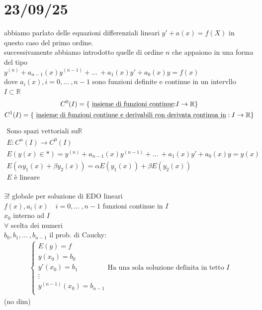 \documentclass[a4paper, oneside]{article}
\begin{document}
\begin{definition}
\end{definition}

\section{23/09/25}
abbiamo parlato delle equazioni differenziali lineari $y' +a(x) = f(X)$ in questo caso del primo ordine.\\
successivamente abbiamo introdotto quelle di ordine $n$ che appaiono in una forma del tipo\\
$y^{(n)}+ a_{n-1}(x)y^{(n-1)}+ ... \ + a_1(x)y' + a_0(x)y = f(x)$\\
dove $a_i(x), i = 0, ... \ , n-1$ sono funzioni definite e continue in un intervllo $I \subset \mathbb{R}$\\

\begin{gather*} 
    C^0(I) = \{\text{ \underbar{insieme di funzioni continue}:} I \to \mathbb{R}\}\\
    C^1(I) = \{\text{ \underbar{insieme di funzioni continue e derivabili con derivata continua in}}: I \to \mathbb{R}\}\\
\end{gather*}


\begin{gather*}
\text{Sono spazi vettoriali su} \mathbb{R}\\
E: C^n(I) \to C^0(I)\\
E (y(x) \in \text{*} ) = y^{(n)}+ a_{n-1}(x)y^{(n-1)}+ ... \ + a_1(x)y' + a_0(x)y = y(x)\\
E(\alpha y_1(x) + \beta y_2(x)) = \alpha E (y_1(x)) + \beta E (y_2(x))\\
E \text{ è lineare}\\
\end{gather*}

\begin{theorem}
        $\exists !$ globale per soluzione di EDO lineari\\
         $f(x), a_i(x) \quad i = 0, ... \ , n-1$ funzioni continue in $I$\\
         $x_0$ interno ad $I$ \\
         $\forall$ scelta dei numeri \\
        $b_0, b_1, ... \ , b_{n-1}$ il prob. di Cauchy: \\
    \begin{gather*}
        \begin{cases}
            E(y) = f\\
            y(x_0) = b_0\\
            y'(x_0) = b_1\\
            \vdots\\
            y^{(n-1)}(x_0) = b_{n-1}\\
        \end{cases}
        \text{Ha una sola soluzione definita in tetto } I
    \end{gather*}
    (no dim)\\
\end{theorem}
\end{document}
